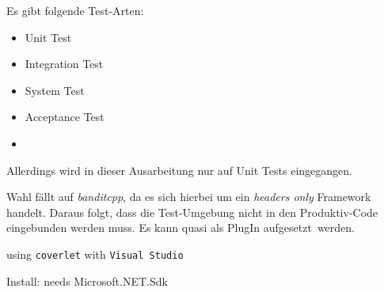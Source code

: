 


Es gibt folgende Test-Arten:
\begin{itemize}
\item Unit Test
\item Integration Test
\item System Test
\item Acceptance Test
\item {}
\end{itemize}


Allerdings wird in dieser Ausarbeitung nur auf Unit Tests eingegangen.








Wahl fällt auf \textit{banditcpp}, da es sich hierbei um ein \textit{headers only} Framework handelt.
Daraus folgt, dass die Test-Umgebung nicht in den Produktiv-Code eingebunden werden muss. Es kann quasi als PlugIn \glqq aufgesetzt\grqq\ werden.














using \texttt{coverlet} with \texttt{Visual Studio}

Install: needs Microsoft.NET.Sdk



